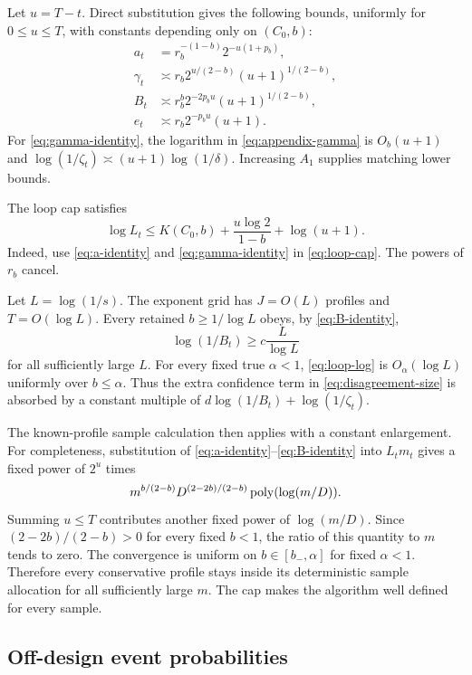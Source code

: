 Let $u=T-t$. Direct substitution gives the following bounds, uniformly for $0\leq u\leq T$, with constants depending only on $(C_0,b)$:
\begin{align}
 a_t&=r_b^{-(1-b)}2^{-u(1+p_b)},
 \label{eq:a-identity}\\
 \gamma_t&\asymp r_b2^{u/(2-b)}(u+1)^{1/(2-b)},
 \label{eq:gamma-identity}\\
 B_t&\asymp r_b^b2^{-2p_bu}(u+1)^{1/(2-b)},
 \label{eq:B-identity}\\
 e_t&\asymp r_b2^{-p_bu}(u+1).
 \label{eq:e-identity}
\end{align}
For \eqref{eq:gamma-identity}, the logarithm in \eqref{eq:appendix-gamma} is $O_b(u+1)$ and $\log(1/\zeta_t)\asymp(u+1)\log(1/\delta)$. Increasing $A_1$ supplies matching lower bounds.

The loop cap satisfies
\begin{equation}
 \log L_t\leq K(C_0,b)+\frac{u\log2}{1-b}+\log(u+1).
 \label{eq:loop-log}
\end{equation}
Indeed, use \eqref{eq:a-identity} and \eqref{eq:gamma-identity} in \eqref{eq:loop-cap}. The powers of $r_b$ cancel.

Let $L=\log(1/s)$. The exponent grid has $J=O(L)$ profiles and $T=O(\log L)$. Every retained $b\geq1/\log L$ obeys, by \eqref{eq:B-identity},
\begin{equation}
 \log(1/B_t)\geq c\frac{L}{\log L}
 \label{eq:B-log-lower}
\end{equation}
for all sufficiently large $L$. For every fixed true $\alpha<1$, \eqref{eq:loop-log} is $O_\alpha(\log L)$ uniformly over $b\leq\alpha$. Thus the extra confidence term in \eqref{eq:disagreement-size} is absorbed by a constant multiple of $d\log(1/B_t)+\log(1/\zeta_t)$.

The known-profile sample calculation then applies with a constant enlargement. For completeness, substitution of \eqref{eq:a-identity}--\eqref{eq:B-identity} into $L_tm_t$ gives a fixed power of $2^u$ times
\[
 m^{b/(2-b)}D^{(2-2b)/(2-b)}\operatorname{poly}(\log(m/D)).
\]
Summing $u\leq T$ contributes another fixed power of $\log(m/D)$. Since $(2-2b)/(2-b)>0$ for every fixed $b<1$, the ratio of this quantity to $m$ tends to zero. The convergence is uniform on $b\in[b_-,\alpha]$ for fixed $\alpha<1$. Therefore every conservative profile stays inside its deterministic sample allocation for all sufficiently large $m$. The cap makes the algorithm well defined for every sample.

\subsection{Off-design event probabilities}

